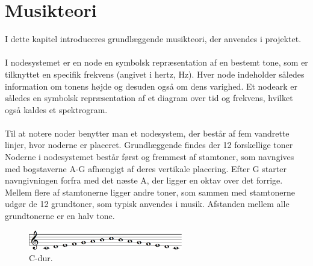 \chapter{Musikteori}
I dette kapitel introduceres grundlæggende musikteori, der anvendes i projektet.
\\ \\
I nodesystemet er en node en symbolsk repræsentation af en bestemt tone, som er tilknyttet en specifik frekvens (angivet i hertz, Hz). Hver node indeholder således information om tonens højde og desuden også om dens varighed. Et nodeark er således en symbolsk repræsentation af et diagram over tid og frekvens, hvilket også kaldes et spektrogram.
\\ \\
Til at notere noder benytter man et nodesystem, der består af fem vandrette linjer, hvor noderne er placeret. Grundlæggende findes der 12 forskellige toner Noderne i nodesystemet består først og fremmest af stamtoner, som navngives med bogstaverne A-G afhængigt af deres vertikale placering. Efter G starter navngivningen forfra med det næste A, der ligger en oktav over det forrige. Mellem flere af stamtonerne ligger andre toner, som sammen med stamtonerne udgør de 12 grundtoner, som typisk anvendes i musik. Afstanden mellem alle grundtonerne er en halv tone.

\begin{figure}[H]
    \centering
    \includegraphics[width = 0.6\textwidth]{figures/C_dur.PNG}
    \caption{C-dur.}
    \label{Cdur}
\end{figure}
